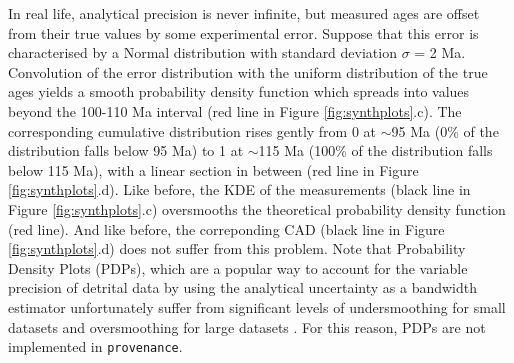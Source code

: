 \documentclass{article}
\begin{document}
In real life, analytical precision is never infinite, but measured
ages are offset from their true values by some experimental error.
Suppose that this error is characterised by a Normal distribution with
standard deviation $\sigma$ = 2 Ma. Convolution of the error
distribution with the uniform distribution of the true ages yields a
smooth probability density function which spreads into values beyond
the 100-110 Ma interval (red line in Figure \ref{fig:synthplots}.c).
The corresponding cumulative distribution rises gently from 0 at
$\sim$95 Ma (0\% of the distribution falls below 95 Ma) to 1 at
$\sim$115 Ma (100\% of the distribution falls below 115 Ma), with a
linear section in between (red line in Figure \ref{fig:synthplots}.d).
Like before, the KDE of the measurements (black line in Figure
\ref{fig:synthplots}.c) oversmooths the theoretical probability
density function (red line). And like before, the correponding CAD
(black line in Figure \ref{fig:synthplots}.d) does not suffer from
this problem. Note that Probability Density Plots (PDPs), which are a
popular way to account for the variable precision of detrital data by
using the analytical uncertainty as a bandwidth estimator
\citep{ludwig2003, sircombe2004b} unfortunately suffer from
significant levels of undersmoothing for small datasets and
oversmoothing for large datasets \citep{vermeesch2012b}. For this
reason, PDPs are not implemented in {\tt provenance}.\\
\end{document}
